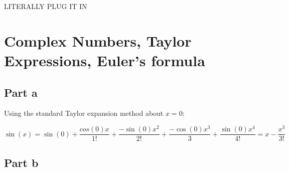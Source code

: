 \documentclass{article}
\theoremstyle{definition}
\numberwithin{equation}{section}
\numberwithin{definition}{section}
\begin{document}
LITERALLY PLUG IT IN 


%	
%	
%	
%	
%	
%	
%	
%	
%	
%	


\section{Complex Numbers, Taylor Expressions, Euler's formula}

\subsection{Part a}

Using the standard Taylor expansion method about $x = 0$:

\[ \sin(x) = \sin(0) + \frac{cos(0) x}{1!} + \frac{-\sin(0) x^2}{2!} + \frac{-\cos(0) x^3}{3} + \frac{\sin(0)x^4}{4!} = x - \frac{x^3}{3!}\]

\subsection{Part b}
\end{document}
